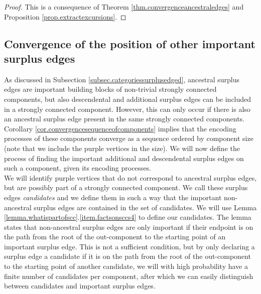 \begin{proof}
This is a consequence of Theorem \ref{thm.convergenceancestraledges} and Proposition \ref{prop.extractexcursions}. 
\end{proof}

\subsection{Convergence of the position of other important surplus edges}
As discussed in Subsection \ref{subsec.categoriessurplusedged}, ancestral surplus edges are important building blocks of non-trivial strongly connected components, but also descendental and additional surplus edges can be included in a strongly connected component. However, this can only occur if there is also an ancestral surplus edge present in the same strongly connected components. Corollary \ref{cor.convergencesequenceofcomponents} implies that the encoding processes of these components converge as a sequence ordered by component size (note that we include the purple vertices in the size). We will now define the process of finding the important additional and descendental surplus edges on such a component, given its encoding processes.\\
We will identify purple vertices that do not correspond to ancestral surplus edges, but are possibly part of a strongly connected component. We call these surplus edges \emph{candidates} and we define them in such a way that the important non-ancestral surplus edges are contained in the set of candidates. We will use Lemma \ref{lemma.whatispartofscc}.\ref{item.factsonsccs4} to define our candidates. The lemma states that non-ancestral surplus edges are only important if their endpoint is on the path from the root of the out-component to the starting point of an important surplus edge. This is not a sufficient condition, but by only declaring a surplus edge a candidate if it is on the path from the root of the out-component to the starting point of another candidate, we will with high probability have a finite number of candidates per component, after which we can easily distinguish between candidates and important surplus edges.\\
